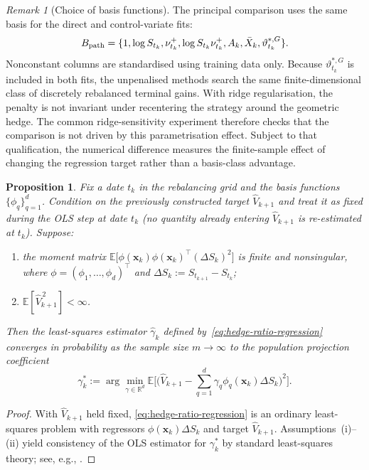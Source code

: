 \documentclass[10pt,a4paper,reqno]{amsart}
\theoremstyle{plain}
\newtheorem{proposition}[theorem]{Proposition}
\theoremstyle{definition}
\theoremstyle{remark}
\newtheorem{remark}[theorem]{Remark}
\theoremstyle{example}
\begin{document}
\begin{remark}[Choice of basis functions]\label{rem:basis-functions}
The  principal comparison uses the same basis for the direct and control-variate  fits:
\[
 B_{\rm path}=\{1,\log S_{t_k},\nu_{t_k}^+,
 \log S_{t_k}\nu_{t_k}^+,A_k,\bar X_k,\vartheta_{t_k}^{*,G}\}.
\]
Nonconstant columns are standardised using training data only. Because
\(\vartheta_{t_k}^{*,G}\) is included in both fits, the unpenalised methods search the same
finite-dimensional class of discretely rebalanced terminal gains. With ridge regularisation, the
penalty is not invariant under recentering the strategy around the geometric hedge. The common
ridge-sensitivity experiment therefore checks that the comparison is not driven by this
parametrisation effect. Subject to that qualification, the numerical difference measures the
finite-sample effect of changing the regression target rather than a basis-class advantage.
\end{remark}

\begin{proposition}\label{prop:CV-hedge-convergence}
Fix a date $t_k$ in the rebalancing grid and the basis functions $\{\phi_q\}_{q=1}^d$.  Condition on the previously constructed target $\hat V_{k+1}$ and treat it as fixed during the OLS step at date $t_k$ (no quantity already entering $\hat V_{k+1}$ is re-estimated at $t_k$). Suppose:
\begin{enumerate}
\item[(i)] the moment matrix $\mathbb{E}\bigl[\phi(\mathbf{x}_k)\phi(\mathbf{x}_k)^\top(\Delta S_k)^2\bigr]$ is finite and nonsingular, where $\phi=(\phi_1,\dots,\phi_d)^\top$ and $\Delta S_k:=S_{t_{k+1}}-S_{t_k}$;
\item[(ii)] $\mathbb{E}[\hat V_{k+1}^{\,2}]<\infty$.
\end{enumerate}
Then the least-squares estimator $\hat\gamma_k$ defined by~\eqref{eq:hedge-ratio-regression} converges in probability as the sample size $m\to\infty$ to the population projection coefficient
$$
  \gamma_k^* := \arg\min_{\gamma\in\mathbb{R}^d}\mathbb{E}\Big[\big(\hat V_{k+1}-\sum_{q=1}^d\gamma_q\phi_q(\mathbf{x}_k)\Delta S_k\big)^2\Big].
$$
\end{proposition}

\begin{proof}
With $\hat V_{k+1}$ held fixed, \eqref{eq:hedge-ratio-regression} is an ordinary least-squares problem with regressors $\phi(\mathbf{x}_k)\Delta S_k$ and target $\hat V_{k+1}$. Assumptions~(i)--(ii) yield consistency of the OLS estimator for $\gamma_k^*$ by standard least-squares theory; see, e.g., \cite[Chapter 1]{Gyorfi2002}.
\end{proof}
\end{document}
